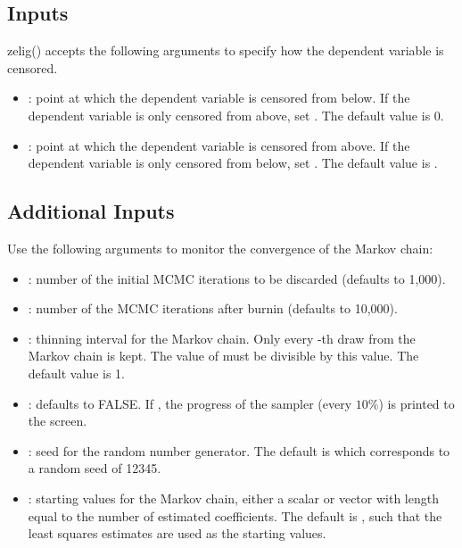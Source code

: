 \documentclass[letterpaper,10pt,english]{sphinxmanual}
\begin{document}
\subsection{Inputs}
\label{vignette:id109}
zelig() accepts the following arguments to specify how the dependent
variable is censored.
\begin{itemize}
\item {} 
: point at which the dependent variable is censored from
below. If the dependent variable is only censored from above, set
. The default value is 0.

\item {} 
: point at which the dependent variable is censored from
above. If the dependent variable is only censored from below, set
. The default value is .

\end{itemize}


\subsection{Additional Inputs}
\label{vignette:id110}
Use the following arguments to monitor the convergence of the Markov
chain:
\begin{itemize}
\item {} 
: number of the initial MCMC iterations to be discarded
(defaults to 1,000).

\item {} 
: number of the MCMC iterations after burnin (defaults to
10,000).

\item {} 
: thinning interval for the Markov chain. Only every
-th draw from the Markov chain is kept. The value of 
must be divisible by this value. The default value is 1.

\item {} 
: defaults to FALSE. If , the progress of the
sampler (every \(10\%\)) is printed to the screen.

\item {} 
: seed for the random number generator. The default is 
which corresponds to a random seed of 12345.

\item {} 
: starting values for the Markov chain, either a scalar
or vector with length equal to the number of estimated coefficients.
The default is , such that the least squares estimates are used
as the starting values.

\end{itemize}
\end{document}
